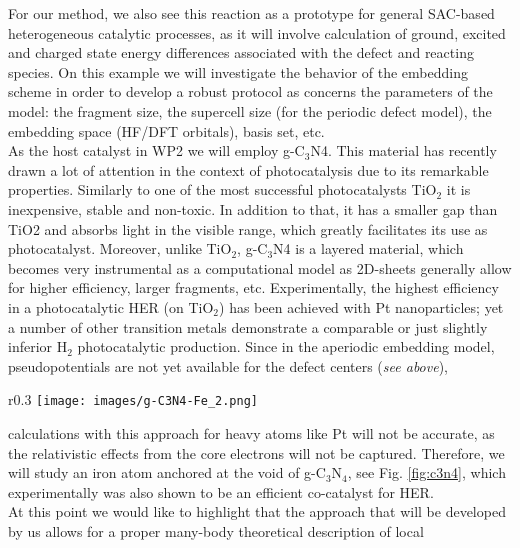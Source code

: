\documentclass[a4paper,11pt,headings=normal]{scrartcl}
\begin{document}
\begin{itemize}
For our method, we also see this reaction as a prototype for general SAC-based heterogeneous catalytic processes, as it will involve calculation of ground, excited and charged state energy differences associated with the defect and reacting species. On this example we will investigate the behavior of the embedding scheme in order to develop a robust protocol as concerns the parameters of the model: the fragment size, the supercell size (for the periodic defect model), the embedding space (HF/DFT orbitals), basis set, etc.\\
As the host catalyst in WP2 we will employ g-C$_3$N4. This material has recently 
drawn a lot of attention in the context of photocatalysis due to its remarkable 
properties.\autocite{Zhu_2021,Wu_2025} Similarly to one of the most successful 
photocatalysts TiO$_2$ it is inexpensive, stable and non-toxic. In addition to 
that, it has a smaller gap than TiO2 and absorbs light in the visible range, which 
greatly facilitates its use as photocatalyst. Moreover, unlike TiO$_2$,  g-C$_3$N4 
is a layered material, which becomes very instrumental as a computational model as 
2D-sheets generally allow for higher efficiency, larger fragments, etc. 
Experimentally, the highest efficiency in a photocatalytic HER (on TiO$_2$) has 
been achieved with Pt nanoparticles; yet a number of other transition metals 
demonstrate a comparable or just slightly inferior H$_2$ photocatalytic 
production.\autocite{Wu_2025} Since in the aperiodic embedding model, 
pseudopotentials are not yet available for the defect centers (\textit{see above}),
\begin{wrapfigure}{r}{0.3\textwidth}
	\centering
	\texttt{[image: images/g-C3N4-Fe\_2.png]}
		\caption{A corrugated g-C$_3$N$_4$ layer\autocite{Gracia_2009} with an iron atom anchored in none of the voids. The exact position of the iron atom and the local structure rearrangement are yet to be determined.}
	  \label{fig:c3n4}
\vspace{-1.em}
\end{wrapfigure}calculations with this approach for heavy atoms like Pt will not 
be accurate, as the relativistic effects from the core electrons will not be 
captured. Therefore, we will study an iron atom anchored at the 
void of g-C$_3$N$_4$, see Fig. \ref{fig:c3n4}, which experimentally was also shown 
to be an efficient co-catalyst for HER.\autocite{Zhang_2019}\\
At this point we would like to highlight that the approach that will be developed 
by us allows for a proper many-body theoretical description of local 

\end{itemize}
\end{document}
